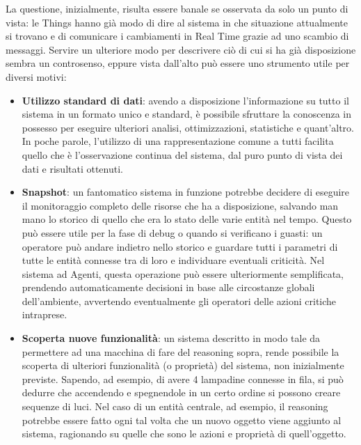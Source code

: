 \documentclass[12pt,a4paper,openright,oneside]{report}
\begin{document}
La questione, inizialmente, risulta essere banale se osservata da solo un punto di vista: le Things hanno già modo di dire al sistema in che situazione attualmente si trovano e di comunicare i cambiamenti in Real Time grazie ad uno scambio di messaggi. Servire un ulteriore modo per descrivere ciò di cui si ha già disposizione sembra un controsenso, eppure vista dall'alto può essere uno strumento utile per diversi motivi:

\begin{itemize}
	\item \textbf{Utilizzo standard di dati}: avendo a disposizione l'informazione su tutto il sistema in un formato unico e standard, è possibile sfruttare la conoscenza in possesso per eseguire ulteriori analisi, ottimizzazioni, statistiche e quant'altro. In poche parole, l'utilizzo di una rappresentazione comune a tutti facilita quello che è l'osservazione continua del sistema, dal puro punto di vista dei dati e risultati ottenuti.
	
	\item \textbf{Snapshot}: un fantomatico sistema in funzione potrebbe decidere di eseguire il monitoraggio completo delle risorse che ha a disposizione, salvando man mano lo storico di quello che era lo stato delle varie entità nel tempo. Questo può essere utile per la fase di debug o quando si verificano i guasti: un operatore può andare indietro nello storico e guardare tutti i parametri di tutte le entità connesse tra di loro e individuare eventuali criticità. Nel sistema ad Agenti, questa operazione può essere ulteriormente semplificata, prendendo automaticamente decisioni in base alle circostanze globali dell'ambiente, avvertendo eventualmente gli operatori delle azioni critiche intraprese.
	
	\item \textbf{Scoperta nuove funzionalità}: un sistema descritto in modo tale da permettere ad una macchina di fare del reasoning sopra, rende possibile la scoperta di ulteriori funzionalità (o proprietà) del sistema, non inizialmente previste. Sapendo, ad esempio, di avere 4 lampadine connesse in fila, si può dedurre che accendendo e spegnendole in un certo ordine si possono creare sequenze di luci. Nel caso di un entità centrale, ad esempio, il reasoning potrebbe essere fatto ogni tal volta che un nuovo oggetto viene aggiunto al sistema, ragionando su quelle che sono le azioni e proprietà di quell'oggetto.
	

\end{itemize}
\end{document}
